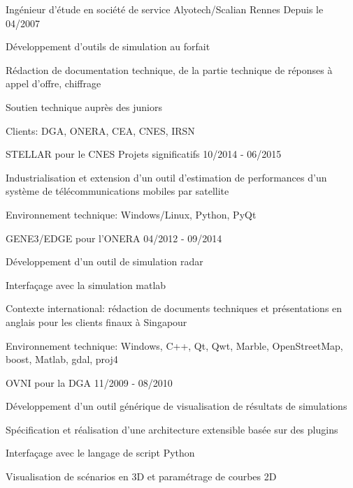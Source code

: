 \begin{cventries}
  \cventry
    {Ingénieur d'étude en société de service}
    {Alyotech/Scalian}
    {Rennes}
    {Depuis le 04/2007}
    {
      \begin{cvitems}
        \item {Développement d'outils de simulation au forfait}
        \item {Rédaction de documentation technique, de la partie technique de réponses à appel d'offre, chiffrage}
        \item {Soutien technique auprès des juniors}
        \item {Clients: DGA, ONERA, CEA, CNES, IRSN}
      \end{cvitems}
    }
  \cventry
    {STELLAR pour le CNES}
    {Projets significatifs}
    {}
    {10/2014 - 06/2015}
    {
      \begin{cvitems}
        \item {Industrialisation et extension d’un outil d’estimation de performances d’un 
			   système de télécommunications mobiles par satellite}
        \item {Environnement technique: Windows/Linux, Python, PyQt}
      \end{cvitems}
    }
  \cventry
    {GENE3/EDGE pour l'ONERA}
    {}
    {}
    {04/2012 - 09/2014}
    {
      \begin{cvitems}
        \item {Développement d’un outil de simulation radar}
        \item {Interfaçage avec la simulation matlab}
		\item {Contexte international: rédaction de documents techniques et 
	  		   présentations en anglais pour les clients finaux à Singapour}
		\item {Environnement technique: Windows, C++, Qt, Qwt, Marble, OpenStreetMap, 
	  		   boost, Matlab, gdal, proj4}
      \end{cvitems}
    }
  \cventry
    {OVNI pour la DGA}
    {}
    {}
    {11/2009 - 08/2010}
    {
      \begin{cvitems}
        \item {Développement d'un outil générique de visualisation de résultats de simulations}
        \item {Spécification et réalisation d'une architecture extensible basée sur des plugins}
        \item {Interfaçage avec le langage de script Python}
        \item {Visualisation de scénarios en 3D et paramétrage de courbes 2D}

\end{cvitems}}
\end{cventries}
